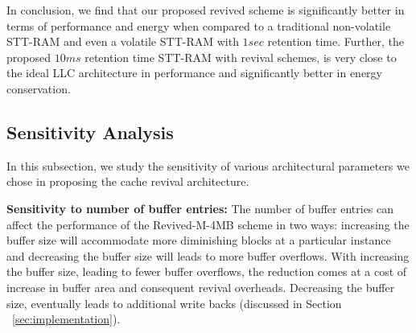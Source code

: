 In conclusion, we find that our proposed revived scheme is significantly better in terms of performance and energy
when compared to a traditional non-volatile STT-RAM and even a volatile STT-RAM with $1sec$ retention time.
Further, the proposed $10ms$ retention time STT-RAM with revival schemes, is very close to the ideal LLC architecture in performance and significantly better in energy conservation.






\subsection{Sensitivity Analysis}
In this subsection, we study the sensitivity of various architectural parameters we chose in proposing the cache revival architecture.

\noindent\textbf{Sensitivity to number of buffer entries:}
The number of buffer entries can affect the performance of the Revived-M-4MB scheme in two ways: increasing the
buffer size will accommodate more diminishing blocks at a particular instance and decreasing the buffer size will
leads to more buffer overflows. With increasing the buffer size, leading to fewer buffer overflows,
the reduction comes at a cost of increase in buffer area and consequent revival overheads. Decreasing the buffer size, eventually
leads to additional write backs (discussed in Section ~\ref{sec:implementation}).

